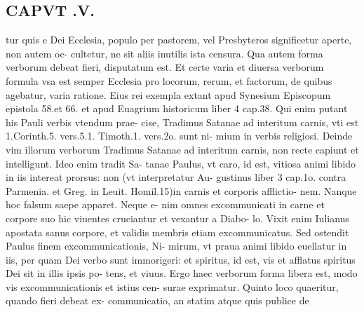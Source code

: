 \documentclass{article}
\begin{document}
\begin{pages}
\section*{CAPVT .V. }
\marginpar{[ p.397 ]}\pstart tur quis e Dei Ecclesia, populo per pastorem, vel Presbyteros significetur aperte, non autem oc- cultetur, ne sit aliis inutilis ista censura. Qua autem forma verborum debeat fieri, disputatum est. Et certe varia et diuersa verborum formula vsa est semper Ecclesia pro locorum, rerum, et factorum, de quibus agebatur, varia ratione. Eius rei exempla extant apud Synesium Episcopum epistola 58.et 66. et apud Euagrium historicum liber 4 cap.38. Qui enim putant his Pauli verbis vtendum prae- cise, Tradimus Satanae ad interitum carnis, vti est 1.Corinth.5. vers.5.1. Timoth.1. vers.2o. sunt ni- mium in verbis religiosi. Deinde vim illorum verborum Tradimus Satanae ad interitum carnis, non recte capiunt et intelligunt. Ideo enim tradit Sa- tanae Paulus, vt caro, id est, vitiosa animi libido in iis intereat prorsus: non (vt interpretatur Au- gustinus liber 3 cap.1o. contra Parmenia. et Greg. in Leuit. Homil.15)in carnis et corporis afflictio- nem. Nanque  hoc falsum saepe apparet. Neque e- nim omnes excommunicati in carne et corpore suo hic viuentes cruciantur et vexantur a Diabo- lo. Vixit enim Iulianus apostata sanus corpore, et validis membris etiam excommunicatus. Sed ostendit Paulus finem excommunicationis, Ni- mirum, vt praua animi libido euellatur in iis, per quam Dei verbo sunt immorigeri: et spiritus, id est, vis et afflatus spiritus Dei sit in illis ipsis po- tens, et viuus. Ergo haec verborum forma libera est, modo vis excommunicationis et istius cen- surae exprimatur.  \pend\pstart Quinto loco quaeritur, quando fieri debeat ex- communicatio, an statim atque quis publice de  \pend

\end{pages}
\end{document}
